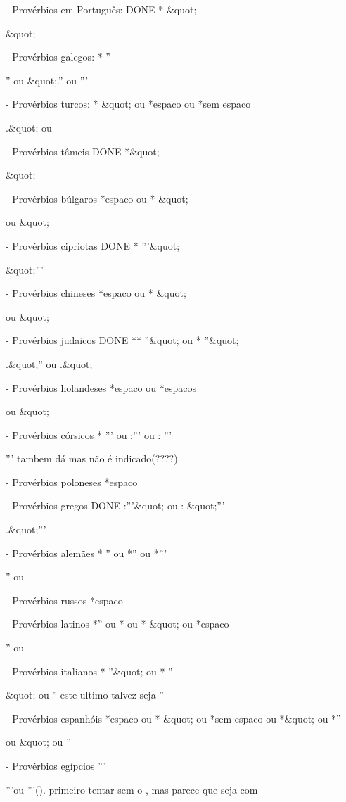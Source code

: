 - Provérbios em Português:    DONE
* &quot;

&quot;

- Provérbios galegos:
* ''

'' ou &quot;.'' ou '''

- Provérbios turcos:
* &quot; ou *{espaco} ou *{sem espaco}

.&quot; ou \n

- Provérbios tâmeis             DONE
*&quot;

&quot;

- Provérbios búlgaros
*{espaco} ou * &quot;

\n ou &quot;

- Provérbios cipriotas          DONE
* '''&quot;

&quot;'''

- Provérbios chineses
*{espaco} ou * &quot;

\n ou &quot;

- Provérbios judaicos             DONE
** ''&quot; ou * ''&quot;

.&quot;'' ou .&quot;

- Provérbios holandeses
*{espaco} ou *{espacos}

\n ou &quot;

- Provérbios córsicos
* ''' ou :''' ou : '''

'''                  \n tambem dá mas não é indicado(????)

- Provérbios poloneses
*{espaco}

\n

- Provérbios gregos         DONE
:'''&quot; ou : &quot;'''

.&quot;'''

- Provérbios alemães
* '' ou *'' ou *'''

'' ou \n

- Provérbios russos
*{espaco}

\n

- Provérbios latinos
*'' ou * ou * &quot; ou *{espaco}

'' ou \n

- Provérbios italianos
* ''&quot; ou * ''

&quot; ou ''                este ultimo talvez seja ''\n

- Provérbios espanhóis
*{espaco} ou * &quot; ou *{sem espaco} ou *&quot; ou *''

\n ou &quot; ou ''\n

- Provérbios egípcios
'''

'''\n ou '''().               primeiro tentar sem o \n, mas parece que seja com \n


